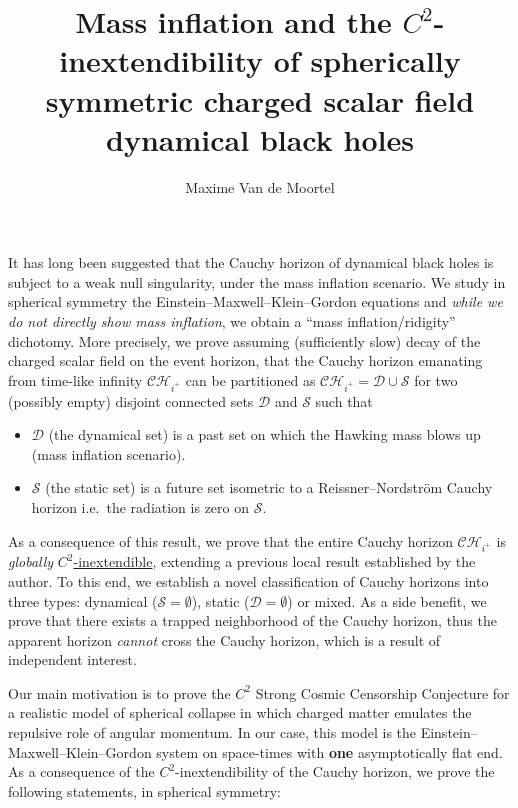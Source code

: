 \documentclass[10pt,a4paper]{article}
\theoremstyle{plain}
\theoremstyle{remark}
\theoremstyle{definition}
\theoremstyle{plain}
\theoremstyle{remark}
\theoremstyle{definition}
\newcommand{\CH}{\mathcal{CH}_{i^+}}
\numberwithin{equation}{section}
\begin{document}
 	\title{Mass inflation and the $C^2$-inextendibility of spherically symmetric charged scalar field dynamical black holes} 
 	\author{Maxime Van de Moortel}
 	\maketitle
 	
 	\abstract
 	
 	It has long been suggested that the Cauchy horizon of dynamical black holes is subject to a weak null singularity, under the mass inflation scenario. 
 	We study in spherical symmetry the Einstein--Maxwell--Klein--Gordon equations and \textit{while we do not directly show mass inflation}, we obtain a ``mass inflation/ridigity'' dichotomy. More precisely, \color{black} we prove assuming (sufficiently slow) decay of the charged scalar field  on the event horizon, that the Cauchy horizon emanating from time-like infinity $\CH$ can be partitioned as $\CH= \mathcal{D} \cup \mathcal{S}$ for two (possibly empty) disjoint connected sets $\mathcal{D}$ and $\mathcal{S}$ such that\begin{itemize}
 		
 		 		\item  $\mathcal{D}$ (the dynamical set) is a past set on which the Hawking mass blows up (mass inflation scenario).
 		

 		\item  $\mathcal{S}$ (the static set) is a future set isometric to a Reissner--Nordstr\"{o}m Cauchy horizon i.e.\ the radiation is zero on $\mathcal{S}$. \color{black}
 	\end{itemize} As a consequence of this result, \color{black} we prove that  the entire Cauchy horizon $\CH$ is \textit{globally} \underline{$C^2$-inextendible}, extending a previous local result established by the author\color{black}. To this end, we establish a novel classification of Cauchy horizons into three types: dynamical ($\mathcal{S}=\emptyset$), static ($\mathcal{D}=\emptyset$) or mixed. As a side benefit, we prove that there exists a trapped neighborhood of the Cauchy horizon, thus the apparent horizon \textit{cannot} cross the Cauchy horizon, which is a result of independent interest. 
 	
 	Our main motivation is to prove the $C^2$ Strong Cosmic Censorship Conjecture for a realistic model of spherical collapse in which charged matter emulates the repulsive role of angular momentum. In our case, this model is the Einstein--Maxwell--Klein--Gordon system on space-times with  \textbf{one} asymptotically flat end. 
 	As a consequence of the $C^2$-inextendibility of the Cauchy horizon, we prove the following statements, in spherical symmetry:
 	
\end{document}
